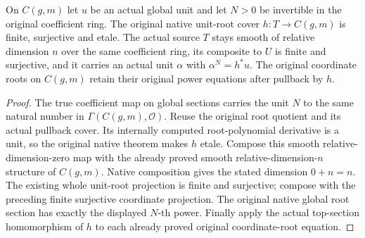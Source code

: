 \begin{lemma}
\label{lem:kn-nadel-kummer-unit-root-layer}
\leanok
{}
On $C(g,m)$ let $u$ be an actual global unit and let $N>0$ be
invertible in the original coefficient ring.  The original native
unit-root cover $h:T\to C(g,m)$ is finite, surjective and etale.
The actual source $T$ stays smooth of relative dimension $n$ over
the same coefficient ring, its composite to $U$ is finite and
surjective, and it carries an actual unit $\alpha$ with
$\alpha^N=h^*u$.  The original coordinate roots on $C(g,m)$ retain
their original power equations after pullback by $h$.
\end{lemma}
\begin{proof}
The true coefficient map on global sections carries the unit $N$
to the same natural number in $\Gamma(C(g,m),\mathcal O)$.
Reuse the original root quotient and its actual pullback cover.
Its internally computed root-polynomial derivative is a unit, so
the original native theorem makes $h$ etale.  Compose this smooth
relative-dimension-zero map with the already proved smooth
relative-dimension-$n$ structure of $C(g,m)$.  Native composition
gives the stated dimension $0+n=n$.  The existing whole unit-root
projection is finite and surjective; compose with the preceding
finite surjective coordinate projection.  The original native
global root section has exactly the displayed $N$-th power.
Finally apply the actual top-section homomorphism of $h$ to each
already proved original coordinate-root equation.
\end{proof}

